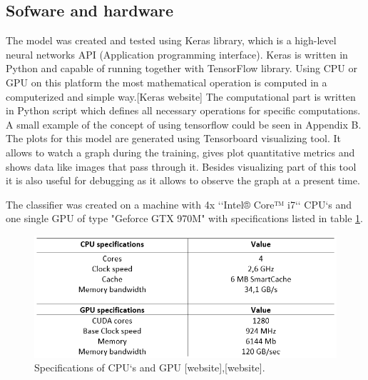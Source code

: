 \subsection{Sofware and hardware}
The model was created and tested using Keras library, which is a high-level neural networks API (Application programming interface). Keras is written in Python and capable of running together with TensorFlow library. Using CPU or GPU on this platform the most mathematical operation  is computed in a computerized and simple way.[Keras website] The computational part is written in Python script which defines all necessary operations for specific computations. A small example of the concept of using tensorflow could be seen in Appendix B. The plots for this model are generated using Tensorboard visualizing tool. It allows to watch a graph during the training, gives plot quantitative metrics and shows data like images that pass through it. Besides visualizing part of this tool it is also useful for debugging as it allows to observe the graph at a present time.\citep{Abadi2016a}

The classifier was created on a machine with 4x ‘‘Intel® Core™ i7‘‘ CPU‘s and one single GPU of type "Geforce GTX 970M" with specifications listed in table \ref{fig:Specs}.

\begin{figure} [H]
\centering
\includegraphics[width=1\textwidth]{figures/Specs}
\caption{Specifications of CPU‘s and GPU [website],[website].}
\label{fig:Specs}
\end{figure}